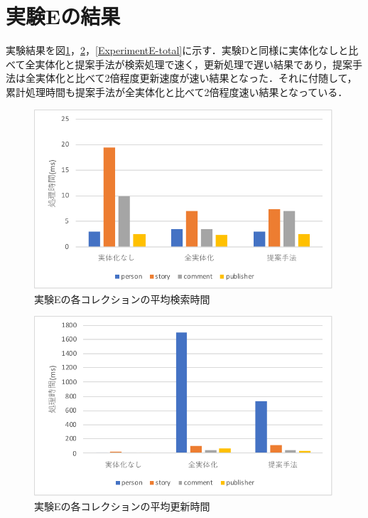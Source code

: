 \documentclass[a4paper,11pt]{ujreport}
\begin{document}
\section{実験Eの結果}
実験結果を図\ref{ExperimentE-find}，\ref{ExperimentE-update}，\ref{ExperimentE-total}に示す．実験Dと同様に実体化なしと比べて全実体化と提案手法が検索処理で速く，更新処理で遅い結果であり，提案手法は全実体化と比べて2倍程度更新速度が速い結果となった．それに付随して，累計処理時間も提案手法が全実体化と比べて2倍程度速い結果となっている．
\begin{figure}[htbp]
	\begin{center}
		\includegraphics[width=30em]{src/ExperimentE-find.pdf} %
	\end{center}
	\caption{実験Eの各コレクションの平均検索時間}
	\label{ExperimentE-find}
\end{figure}
\begin{figure}[htbp]
	\begin{center}
		\includegraphics[width=30em]{src/ExperimentE-update.pdf} %
	\end{center}
	\caption{実験Eの各コレクションの平均更新時間}
	\label{ExperimentE-update}
\end{figure}
\end{document}
